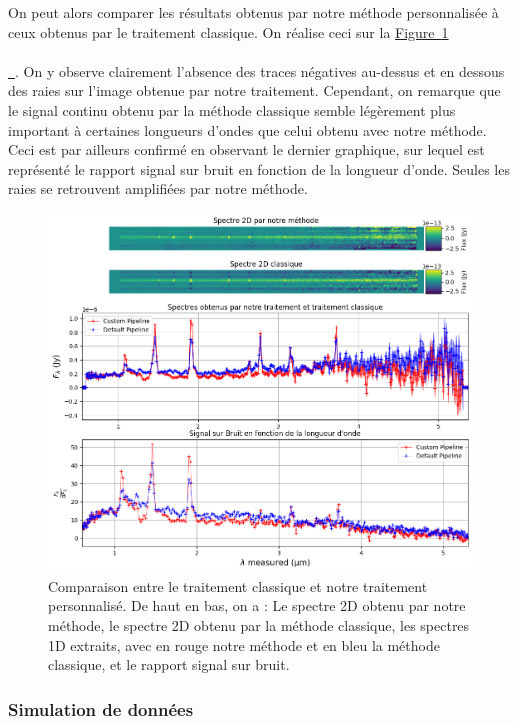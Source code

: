 \documentclass[12pt, a4paper]{article}
\newcommand*{\figref}[2][]{%
  \hyperref[{#2}]{%
    Figure~\ref*{#2}%
    \ifx\\#1\\%
    \else
      \,#1%
    \fi
  }%
}
\begin{document}
On peut alors comparer les résultats obtenus par notre méthode personnalisée à ceux obtenus par le traitement classique. On réalise ceci sur la \figref{fig:comparaison_mast_custom}. On y observe clairement l'absence des traces négatives au-dessus et en dessous des raies sur l'image obtenue par notre traitement. Cependant, on remarque que le signal continu obtenu par la méthode classique semble légèrement plus important à certaines longueurs d'ondes que celui obtenu avec notre méthode. Ceci est par ailleurs confirmé en observant le dernier graphique, sur lequel est représenté le rapport signal sur bruit en fonction de la longueur d'onde. Seules les raies se retrouvent amplifiées par notre méthode.\\

\begin{figure}[!h]
  \centering
  \includegraphics[scale=0.7]{assets/comparaison_spectres_mast_custom.png}
  \caption{Comparaison entre le traitement classique et notre traitement personnalisé. De haut en bas, on a : Le spectre 2D obtenu par notre méthode, le spectre 2D obtenu par la méthode classique, les spectres 1D extraits, avec en rouge notre méthode et en bleu la méthode classique, et le rapport signal sur bruit.}
  \label{fig:comparaison_mast_custom}
\end{figure}

\subsubsection{Simulation de données}
\end{document}
